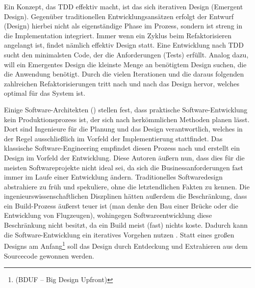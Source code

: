 Ein Konzept, das TDD effektiv macht, ist das sich iterativen Design (Emergent Design). Gegenüber traditionellen Entwicklungsansätzen erfolgt der Entwurf (Design) hierbei nicht als eigenständige Phase im Prozess, sondern ist streng in die Implementation integriert. Immer wenn ein Zyklus beim Refaktorisieren angelangt ist, findet nämlich effektiv Design statt. Eine Entwicklung nach TDD sucht den minimalsten Code, der die Anforderungen (Tests) erfüllt. Analog dazu, will ein Emergentes Design die kleinste Menge an benötigtem Design suchen, die die Anwendung benötigt. Durch die vielen Iterationen und die daraus folgenden zahlreichen Refaktorisierungen tritt nach und nach das Design hervor, welches optimal für das System ist.


Einige Software-Architekten (\cite{neal_ford_emergent_2010,jack_reeves_three_1992,glenn_vanderburg_real_2010}) stellen fest, dass praktische Software\hyp{}Entwicklung kein Produktionsprozess ist, der sich nach herkömmlichen Methoden planen lässt. Dort sind Ingenieure für die Planung und das Design verantwortlich, welches in der Regel ausschließlich im Vorfeld der Implementierung stattfindet. Das klassische Software-Engineering empfindet diesen Prozess nach und erstellt ein Design im Vorfeld der Entwicklung. Diese Autoren äußern nun, dass dies für die meisten Softwareprojekte nicht ideal sei, da sich die Businessanforderungen fast immer im Laufe einer Entwicklung ändern. Traditionelles Softwaredesign abstrahiere zu früh und spekuliere, ohne die letztendlichen Fakten zu kennen. Die ingenieurswissenschaftlichen Diszplinen hätten außerdem die Beschränkung, dass ein Build-Prozess äußerst teuer ist (man denke den Bau einer Brücke oder die Entwicklung von Flugzeugen), wohingegen Softwareentwicklung diese Beschränkung nicht besitzt, da ein Build meist (fast) nichts koste. Dadurch kann die Software-Entwicklung ein iteratives Vorgehen nutzen \cite{neal_ford_emergent_2010,glenn_vanderburg_real_2010,jack_reeves_three_1992}. Statt eines großen Designs am Anfang\footnote{(BDUF -- Big Design Upfront)} soll das Design durch Entdeckung und Extrahieren aus dem Sourcecode gewonnen werden.


